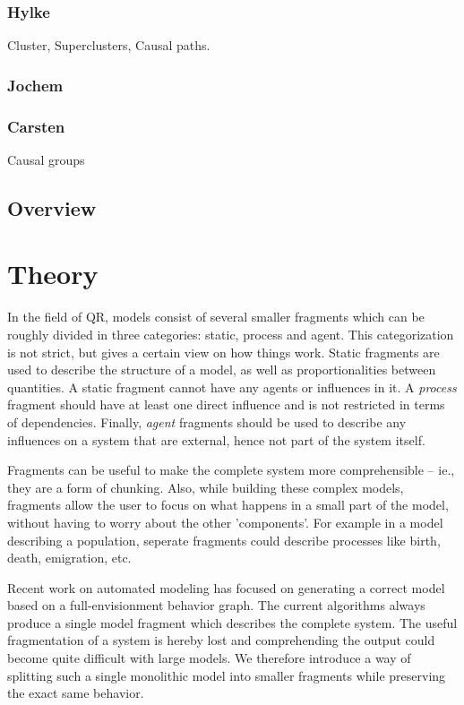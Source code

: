 \documentclass{article}
\begin{document}
\subsubsection{Hylke}
Cluster, Superclusters, Causal paths.

\subsubsection{Jochem}

\subsubsection{Carsten}
Causal groups %

\subsection{Overview}

\section{Theory}

In the field of QR, models %
consist of
several smaller fragments which can be roughly divided in three categories:
static, process and agent. This categorization is not strict, but gives
a certain view on how things work. Static fragments are used to describe the
structure of a model, as well as proportionalities between quantities. A static
fragment cannot have any agents or influences in it. A \emph{process} fragment
should have at least one direct influence and is not restricted in terms of dependencies. %
Finally, \emph{agent} fragments should be used to describe any influences on a
system that are external, hence not part of the system itself.

Fragments can be useful to make the complete system more comprehensible -- ie., they are a form of chunking. 
Also, while building these complex models, fragments allow the user to focus on
what happens in a small part of the model, without having to worry about the
other 'components'. For example in a model describing a population, seperate
fragments could describe processes like birth, death, emigration, etc.

Recent work on automated modeling \cite{buisman, vanweelden, liem} has focused
on generating a correct model based on a full-envisionment behavior graph. The
current algorithms always produce a single model fragment which describes the
complete system. The useful fragmentation of a system is hereby lost and
comprehending the output could become quite difficult with large models. We
therefore introduce a way of splitting such a single monolithic model into
smaller fragments while preserving the exact same behavior.
\end{document}

